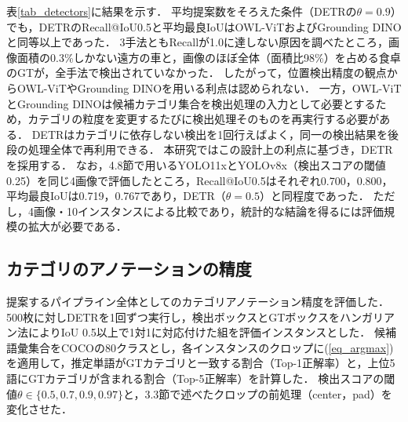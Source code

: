 表\ref{tab_detectors}に結果を示す．
平均提案数をそろえた条件（DETRの$ \theta = 0.9 $）でも，DETRのRecall@IoU0.5と平均最良IoUはOWL-ViTおよびGrounding DINOと同等以上であった．
3手法ともRecallが1.0に達しない原因を調べたところ，画像面積の0.3\%しかない遠方の車と，画像のほぼ全体（面積比98\%）を占める食卓のGTが，全手法で検出されていなかった．
したがって，位置検出精度の観点からOWL-ViTやGrounding DINOを用いる利点は認められない．
一方，OWL-ViTとGrounding DINOは候補カテゴリ集合を検出処理の入力として必要とするため，カテゴリの粒度を変更するたびに検出処理そのものを再実行する必要がある．
DETRはカテゴリに依存しない検出を1回行えばよく，同一の検出結果を後段の処理全体で再利用できる．
本研究ではこの設計上の利点に基づき，DETRを採用する．
なお，4.8節で用いるYOLO11xとYOLOv8x（検出スコアの閾値0.25）を同じ4画像で評価したところ，Recall@IoU0.5はそれぞれ0.700，0.800，平均最良IoUは0.719，0.767であり，DETR（$ \theta = 0.5 $）と同程度であった．
ただし，4画像・10インスタンスによる比較であり，統計的な結論を得るには評価規模の拡大が必要である．

\subsection{カテゴリのアノテーションの精度}
提案するパイプライン全体としてのカテゴリアノテーション精度を評価した．
500枚に対しDETRを1回ずつ実行し，検出ボックスとGTボックスをハンガリアン法\cite{ref_Hungarian}によりIoU 0.5以上で1対1に対応付けた組を評価インスタンスとした．
候補語彙集合をCOCOの80クラスとし，各インスタンスのクロップに(\ref{eq_argmax})を適用して，推定単語がGTカテゴリと一致する割合（Top-1正解率）と，上位5語にGTカテゴリが含まれる割合（Top-5正解率）を計算した．
検出スコアの閾値$ \theta \in \{0.5, 0.7, 0.9, 0.97\} $と，3.3節で述べたクロップの前処理（center，pad）を変化させた．


